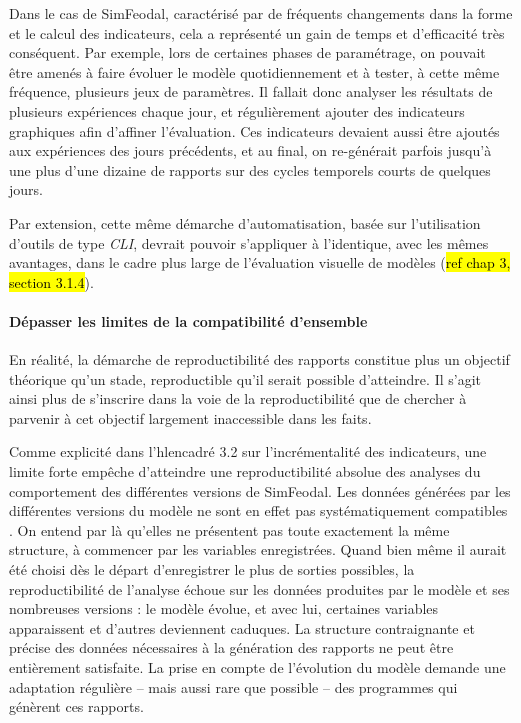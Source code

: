 	Dans le cas de SimFeodal, caractérisé par de fréquents changements dans la forme et le calcul des indicateurs, cela a représenté un gain de temps et d'efficacité très conséquent.
	Par exemple, lors de certaines phases de paramétrage, on pouvait être amenés à faire évoluer le modèle quotidiennement et à tester, à cette même fréquence, plusieurs jeux de paramètres.
	Il fallait donc analyser les résultats de plusieurs expériences chaque jour, et régulièrement ajouter des indicateurs graphiques afin d'affiner l'évaluation.
	Ces indicateurs devaient aussi être ajoutés aux expériences des jours précédents, et au final, on re-générait parfois jusqu'à une plus d'une dizaine de rapports sur des cycles temporels courts de quelques jours.
		
	Par extension, cette même démarche d'automatisation, basée sur l'utilisation d'outils de type \textit{CLI}, devrait pouvoir s'appliquer à l'identique, avec les mêmes avantages, dans le cadre plus large de l'évaluation visuelle de modèles (\hl{ref chap 3, section 3.1.4}).

%
%


	\paragraph{Dépasser les limites de la compatibilité d'ensemble}
	En réalité, la démarche de reproductibilité des rapports constitue plus un objectif théorique qu'un stade, \og reproductible\fg{} qu'il serait possible d'atteindre.
	Il s'agit ainsi plus de s'inscrire dans la voie de la reproductibilité que de chercher à parvenir à cet objectif largement inaccessible dans les faits.
	
	Comme explicité dans l'hl{encadré 3.2} sur l'incrémentalité des indicateurs, une limite forte empêche d'atteindre une reproductibilité absolue des analyses du comportement des différentes versions de SimFeodal.
	Les données générées par les différentes versions du modèle ne sont en effet pas systématiquement \og compatibles \fg{}.
	On entend par là qu'elles ne présentent pas toute exactement la même structure, à commencer par les variables enregistrées.
	Quand bien même il aurait été choisi dès le départ d'enregistrer le plus de sorties possibles, la reproductibilité de l'analyse échoue sur les données produites par le modèle et ses nombreuses versions : le modèle évolue, et avec lui, certaines variables apparaissent et d'autres deviennent caduques.
	La structure contraignante et précise des données nécessaires à la génération des rapports ne peut être entièrement satisfaite.
	La prise en compte de l'évolution du modèle demande une adaptation régulière -- mais aussi rare que possible -- des programmes qui génèrent ces rapports.
	
